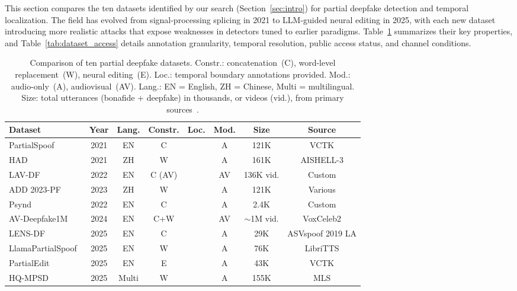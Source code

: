 \documentclass[journal]{IEEEtran}
\newcommand{\cmark}{\ding{51}}
\begin{document}
This section compares the ten datasets identified by our search (Section~\ref{sec:intro}) for partial deepfake detection and temporal localization. The field has evolved from signal-processing splicing in 2021 to LLM-guided neural editing in 2025, with each new dataset introducing more realistic attacks that expose weaknesses in detectors tuned to earlier paradigms. Table~\ref{tab:datasets} summarizes their key properties, and Table~\ref{tab:dataset_access} details annotation granularity, temporal resolution, public access status, and channel conditions.

\begin{table}[t]
\centering
\caption{Comparison of ten partial deepfake datasets. Constr.: concatenation~(C), word-level replacement~(W), neural editing~(E). Loc.: temporal boundary annotations provided. Mod.: audio-only~(A), audiovisual~(AV). Lang.: EN = English, ZH = Chinese, Multi = multilingual. Size: total utterances (bonafide + deepfake) in thousands, or videos (vid.), from primary sources~\cite{li2025hqmpsd,luong2025llamapartialspoof,zhang2025partialedit,cai2023lavdf_cviu,yi2023add,liu2025lensdf}.}
\label{tab:datasets}
\small
\begin{tabular}{lccccccc}
\toprule
\textbf{Dataset} & \textbf{Year} & \textbf{Lang.} & \textbf{Constr.} & \textbf{Loc.} & \textbf{Mod.} & \textbf{Size} & \textbf{Source} \\
\midrule
PartialSpoof~\cite{zhang2023partialspoof} & 2021 & EN & C & \cmark & A & 121K & VCTK \\
HAD~\cite{yi2021had} & 2021 & ZH & W & \cmark & A & 161K & AISHELL-3 \\
LAV-DF~\cite{cai2022lavdf} & 2022 & EN & C (AV) & \cmark & AV & 136K vid. & Custom \\
ADD 2023-PF~\cite{yi2023add} & 2023 & ZH & W & \cmark & A & 121K & Various \\
Psynd~\cite{zhang2022localizing} & 2022 & EN & C & \cmark & A & 2.4K & Custom \\
AV-Deepfake1M~\cite{cai2024avdeepfake1m} & 2024 & EN & C+W & \cmark & AV & ${\sim}$1M vid. & VoxCeleb2 \\
LENS-DF~\cite{liu2025lensdf} & 2025 & EN & C & \cmark & A & 29K & ASVspoof 2019 LA \\
LlamaPartialSpoof~\cite{luong2025llamapartialspoof} & 2025 & EN & W & \cmark & A & 76K & LibriTTS \\
PartialEdit~\cite{zhang2025partialedit} & 2025 & EN & E & \cmark & A & 43K & VCTK \\
HQ-MPSD~\cite{li2025hqmpsd} & 2025 & Multi & W & \cmark & A & 155K & MLS \\
\bottomrule
\end{tabular}
\end{table}
\end{document}
